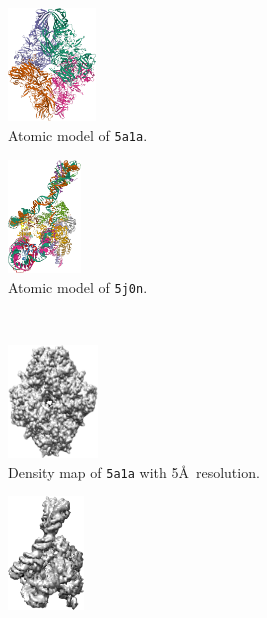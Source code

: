 \begin{figure}[ht!]
    \centering
    \begin{minipage}[b]{0.45\linewidth}
        \centering
        \begin{subfigure}[b]{0.46\linewidth}
            \centering
            \includegraphics[height=3cm]{figures/5a1a_pdb.png}
            \caption{Atomic model of \texttt{5a1a}.}
        \end{subfigure}
        \hfill
        \begin{subfigure}[b]{0.46\linewidth}
            \centering
            \includegraphics[height=3cm]{figures/5j0n_pdb.png}
            \caption{Atomic model of \texttt{5j0n}.}
        \end{subfigure}
        \\ \vspace{0.5em}
        \begin{subfigure}[b]{0.46\linewidth}
            \centering
            \includegraphics[height=3cm]{figures/5a1a_5A_.png}
            \caption{Density map of \texttt{5a1a} with 5\AA\ resolution.}
        \end{subfigure}
        \hfill
        \begin{subfigure}[b]{0.46\linewidth}
            \centering
            \includegraphics[height=3cm]{figures/5j0n_5A_.png}

\end{subfigure}
\end{minipage}
\end{figure}
